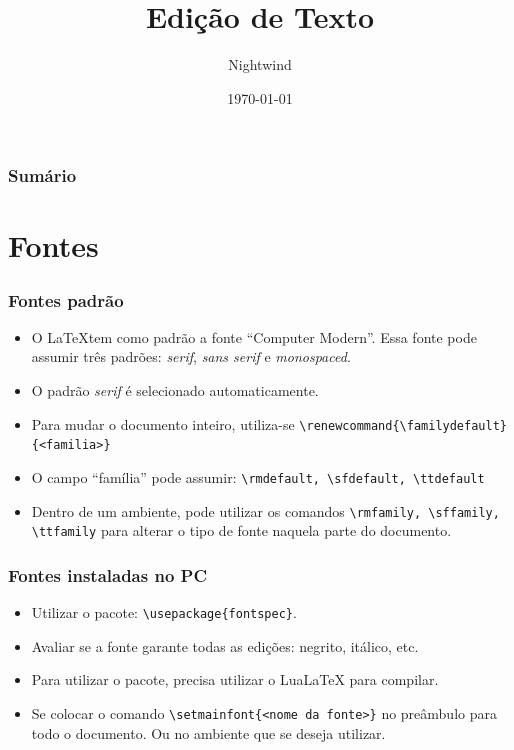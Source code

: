 \documentclass{beamer}
\title{Edição de Texto}
\author{Nightwind}
\institute[CTISM]{Colégio Técnico Industrial de Santa Maria}
\date{\today}
\begin{document}
\frame{\titlepage}

\begin{frame}
    \frametitle{Sumário}
    \tableofcontents
\end{frame}

\section{Fontes}
\begin{frame}[fragile]
    \frametitle{Fontes padrão}

    \begin{itemize}
        \item O \LaTeX tem como padrão a fonte ``Computer Modern''. Essa fonte pode assumir três padrões: \textit{serif}, \textit{sans serif} e \textit{monospaced}.
        \item O padrão \textit{serif} é selecionado automaticamente. 
        \item Para mudar o documento inteiro, utiliza-se \lstinline[style=myStyleLatex]!\renewcommand{\familydefault}{<familia>}!
        \item O campo ``família'' pode assumir: \lstinline[style=myStyleLatex]!\rmdefault, \sfdefault, \ttdefault!
        \item Dentro de um ambiente, pode utilizar os comandos \lstinline[style=myStyleLatex]!\rmfamily, \sffamily, \ttfamily! para alterar o tipo de fonte naquela parte do documento.
    \end{itemize}

\end{frame}

\begin{frame}[fragile]
    \frametitle{Fontes instaladas no PC}

    \begin{itemize}
        \item Utilizar o pacote: \lstinline[style=myStyleLatex]!\usepackage{fontspec}!. 
        \item Avaliar se a fonte garante todas as edições: negrito, itálico, etc.
        \item Para utilizar o pacote, precisa utilizar o LuaLaTeX para compilar.
        \item Se colocar o comando \lstinline[style=myStyleLatex]!\setmainfont{<nome da fonte>}! no preâmbulo para todo o documento. Ou no ambiente que se deseja utilizar.
    \end{itemize}

\end{frame}
\end{document}
